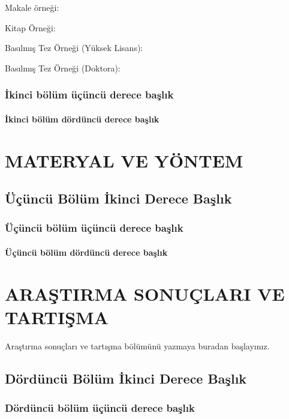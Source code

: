 \documentclass[12pt,oneside]{report}
\begin{document}
	Makale örneği: \cite{Acar2016}
	
	Kitap Örneği: \cite{Aral2013}
	
	Basılmış Tez Örneği (Yüksek Lisans): \cite{Turgay2021}
	
	Basılmış Tez Örneği (Doktora): \cite{Acar2015}
	
	
	\subsection{İkinci bölüm üçüncü derece başlık}

	\subsubsection{İkinci bölüm dördüncü derece başlık}
	
	\chapter{MATERYAL VE YÖNTEM}
	
	\section{Üçüncü Bölüm İkinci Derece Başlık}
	
	\subsection{Üçüncü bölüm üçüncü derece başlık}
	
	\subsubsection{Üçüncü bölüm dördüncü derece başlık}

	
	\chapter{ARAŞTIRMA SONUÇLARI VE TARTIŞMA}
	
	Araştırma sonuçları ve tartışma bölümünü yazmaya buradan başlayınız.
	
	\section{Dördüncü Bölüm İkinci Derece Başlık}
	
	\subsection{Dördüncü bölüm üçüncü derece başlık}
	
\end{document}
